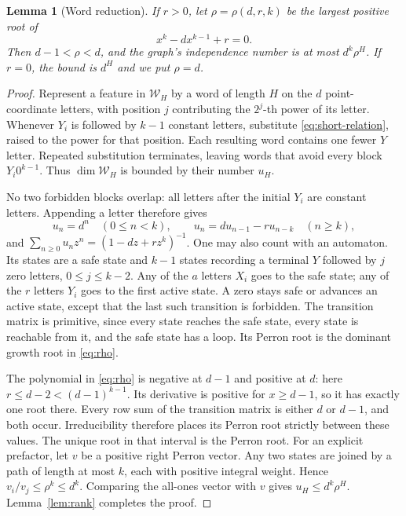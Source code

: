 \documentclass[11pt,a4paper]{article}
\newcommand{\Wcal}{\mathcal W}
\newtheorem{lemma}[theorem]{Lemma}
\theoremstyle{definition}
\theoremstyle{remark}
\numberwithin{equation}{section}
\begin{document}
\begin{lemma}[Word reduction]\label{lem:words}
If $r>0$, let $\rho=\rho(d,r,k)$ be the largest positive root of
\begin{equation}\label{eq:rho}
x^k-dx^{k-1}+r=0.
\end{equation}
Then $d-1<\rho<d$, and the graph's independence number is at most $d^k\rho^H$. If $r=0$, the bound is $d^H$ and we put $\rho=d$.
\end{lemma}

\begin{proof}
Represent a feature in $\Wcal_H$ by a word of length $H$ on the $d$ point-coordinate letters, with position $j$ contributing the $2^j$-th power of its letter. Whenever $Y_i$ is followed by $k-1$ constant letters, substitute \eqref{eq:short-relation}, raised to the power for that position. Each resulting word contains one fewer $Y$ letter. Repeated substitution terminates, leaving words that avoid every block $Y_i0^{k-1}$. Thus $\dim\Wcal_H$ is bounded by their number $u_H$.

No two forbidden blocks overlap: all letters after the initial $Y_i$ are constant letters. Appending a letter therefore gives
\[
u_n=d^n\quad(0\le n<k),\qquad u_n=du_{n-1}-ru_{n-k}\quad(n\ge k),
\]
and $\sum_{n\ge0}u_nz^n=(1-dz+rz^k)^{-1}$. One may also count with an automaton. Its states are a safe state and $k-1$ states recording a terminal $Y$ followed by $j$ zero letters, $0\le j\le k-2$. Any of the $a$ letters $X_i$ goes to the safe state; any of the $r$ letters $Y_i$ goes to the first active state. A zero stays safe or advances an active state, except that the last such transition is forbidden. The transition matrix is primitive, since every state reaches the safe state, every state is reachable from it, and the safe state has a loop. Its Perron root is the dominant growth root in \eqref{eq:rho}.

The polynomial in \eqref{eq:rho} is negative at $d-1$ and positive at $d$: here $r\le d-2<(d-1)^{k-1}$. Its derivative is positive for $x\ge d-1$, so it has exactly one root there. Every row sum of the transition matrix is either $d$ or $d-1$, and both occur. Irreducibility therefore places its Perron root strictly between these values. The unique root in that interval is the Perron root. For an explicit prefactor, let $v$ be a positive right Perron vector. Any two states are joined by a path of length at most $k$, each with positive integral weight. Hence $v_i/v_j\le\rho^k\le d^k$. Comparing the all-ones vector with $v$ gives $u_H\le d^k\rho^H$. Lemma~\ref{lem:rank} completes the proof.
\end{proof}
\end{document}
